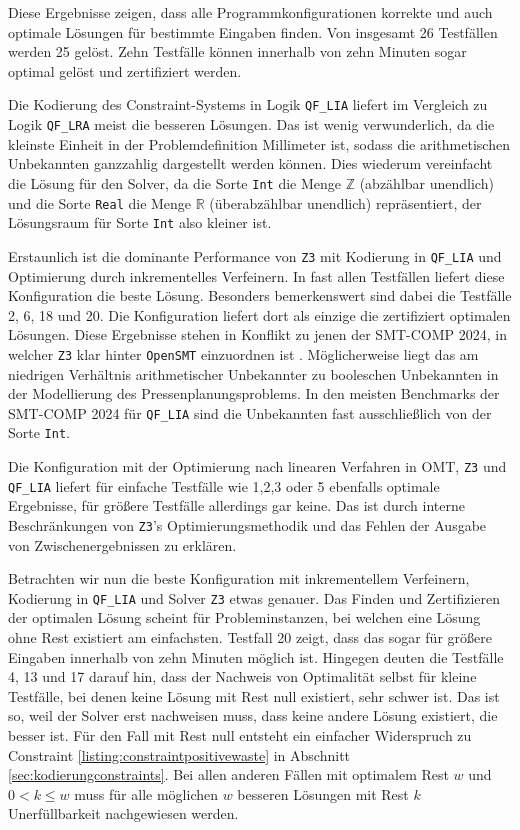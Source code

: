 Diese Ergebnisse zeigen, dass alle Programmkonfigurationen korrekte und auch optimale Lösungen für bestimmte Eingaben finden.
Von insgesamt 26 Testfällen werden 25 gelöst.
Zehn Testfälle können innerhalb von zehn Minuten sogar optimal gelöst und zertifiziert werden.

Die Kodierung des Constraint-Systems in Logik \texttt{QF\_LIA} liefert im Vergleich zu Logik \texttt{QF\_LRA} meist die besseren Lösungen.
Das ist wenig verwunderlich, da die kleinste Einheit in der Problemdefinition Millimeter ist, sodass die arithmetischen Unbekannten ganzzahlig dargestellt werden können.
Dies wiederum vereinfacht die Lösung für den Solver, da die Sorte \texttt{Int} die Menge $\mathbb{Z}$ (abzählbar unendlich) und
die Sorte \texttt{Real} die Menge $\mathbb{R}$ (überabzählbar unendlich) repräsentiert, der Lösungsraum für Sorte \texttt{Int} also kleiner ist.

Erstaunlich ist die dominante Performance von \texttt{Z3} mit Kodierung in \texttt{QF\_LIA} und Optimierung durch inkrementelles Verfeinern.
In fast allen Testfällen liefert diese Konfiguration die beste Lösung.
Besonders bemerkenswert sind dabei die Testfälle 2, 6, 18 und 20.
Die Konfiguration liefert dort als einzige die zertifiziert optimalen Lösungen.
Diese Ergebnisse stehen in Konflikt zu jenen der SMT-COMP 2024, in welcher \texttt{Z3} klar hinter \texttt{OpenSMT} einzuordnen ist \cite{smtcomp2024results}.
Möglicherweise liegt das am niedrigen Verhältnis arithmetischer Unbekannter zu booleschen Unbekannten in der Modellierung des Pressenplanungsproblems.
In den meisten Benchmarks der SMT-COMP 2024 für \texttt{QF\_LIA} sind die Unbekannten fast ausschließlich von der Sorte \texttt{Int}.

Die Konfiguration mit der Optimierung nach linearen Verfahren in OMT, \texttt{Z3} und \texttt{QF\_LIA}
liefert für einfache Testfälle wie 1,2,3 oder 5 ebenfalls optimale Ergebnisse, für größere Testfälle allerdings gar keine.
Das ist durch interne Beschränkungen von \texttt{Z3}'s Optimierungsmethodik und das Fehlen der Ausgabe von Zwischenergebnissen zu erklären.

Betrachten wir nun die beste Konfiguration mit inkrementellem Verfeinern, Kodierung in \texttt{QF\_LIA} und Solver \texttt{Z3} etwas genauer.
Das Finden und Zertifizieren der optimalen Lösung scheint für Probleminstanzen, bei welchen eine Lösung ohne Rest existiert am einfachsten.
Testfall 20 zeigt, dass das sogar für größere Eingaben innerhalb von zehn Minuten möglich ist.
Hingegen deuten die Testfälle 4, 13 und 17 darauf hin, dass der Nachweis von Optimalität selbst für kleine Testfälle,
bei denen keine Lösung mit Rest null existiert, sehr schwer ist.
Das ist so, weil der Solver erst nachweisen muss, dass keine andere Lösung existiert, die besser ist.
Für den Fall mit Rest null entsteht ein einfacher Widerspruch zu Constraint \ref{listing:constraintpositivewaste} in Abschnitt \ref{sec:kodierungconstraints}.
Bei allen anderen Fällen mit optimalem Rest $w$ und $0 < k \leq w$ muss für alle möglichen $w$ besseren Lösungen mit Rest $k$ Unerfüllbarkeit nachgewiesen werden.

